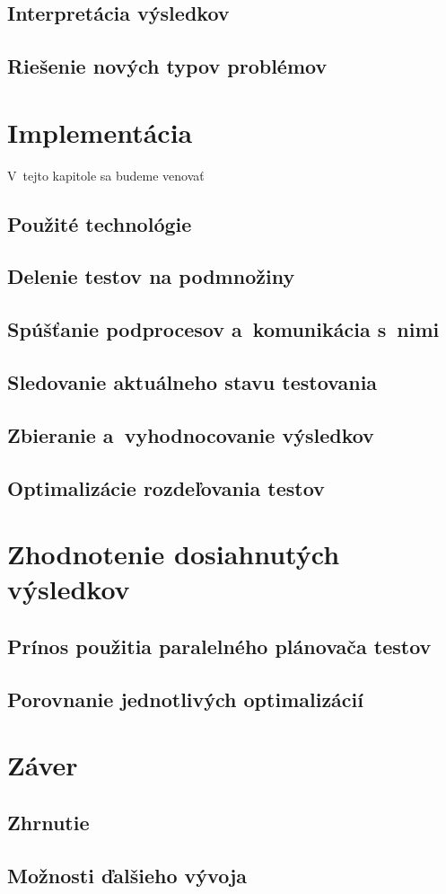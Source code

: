 \section{Interpretácia výsledkov}
\section{Riešenie nových typov problémov}


\chapter{Implementácia}
V~tejto kapitole sa budeme venovať 
\section{Použité technológie}
\section{Delenie testov na podmnožiny}
\section{Spúšťanie podprocesov a~komunikácia s~nimi}
\section{Sledovanie aktuálneho stavu testovania}
\section{Zbieranie a~vyhodnocovanie výsledkov}
\section{Optimalizácie rozdeľovania testov}


\chapter{Zhodnotenie dosiahnutých výsledkov}
\section{Prínos použitia paralelného plánovača testov}
\section{Porovnanie jednotlivých optimalizácií}


\chapter{Záver}
\section{Zhrnutie}
\section{Možnosti ďalšieho vývoja}

